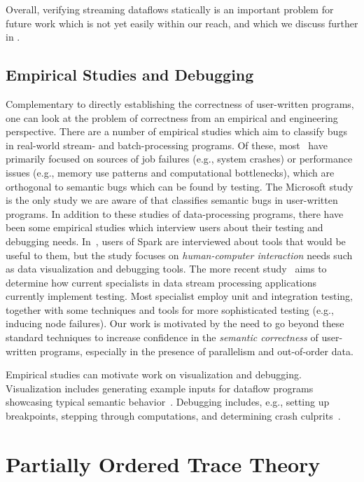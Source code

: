 Overall, verifying streaming dataflows statically is an important problem for future work which is not yet easily within our reach, and which we discuss further in .

\subsection{Empirical Studies and Debugging}

Complementary to directly establishing the correctness of user-written programs, one can look at the problem of correctness from an empirical and engineering perspective.
There are a number of empirical studies which aim to classify bugs in real-world stream- and batch-processing programs. Of these, most~\cite{schroeder2009large, kavulya2010analysis, li2013characteristic, zhou2015empirical} have primarily focused on sources of job failures (e.g., system crashes) or performance issues (e.g., memory use patterns and computational bottlenecks), which are orthogonal to semantic bugs which can be found by testing. The Microsoft study~\cite{xiao2014nondeterminism} is the only study we are aware of that classifies semantic bugs in user-written programs.
In addition to these studies of data-processing programs, there have been some empirical studies which interview users about their testing and debugging needs. In~\cite{fisher2012interactions}, users of Spark are interviewed about tools that would be useful to them, but the study focuses on \emph{human-computer interaction} needs such as data visualization and debugging tools. The more recent study~\cite{vianna2019exploratory} aims to determine how current specialists in data stream processing applications currently implement testing. Most specialist employ unit and integration testing, together with some techniques and tools for more sophisticated testing (e.g., inducing node failures). Our work is motivated by the need to go beyond these standard techniques to increase confidence in the \emph{semantic correctness} of user-written programs, especially in the presence of parallelism and out-of-order data.

Empirical studies can motivate work on visualization and debugging.
Visualization includes generating example inputs for dataflow programs showcasing typical semantic behavior~\cite{olston2009generating}. Debugging includes, e.g., setting up breakpoints, stepping through computations, and determining crash culprits~\cite{gulzar2016bigdebug,olston2011inspector}.

\section{Partially Ordered Trace Theory}

